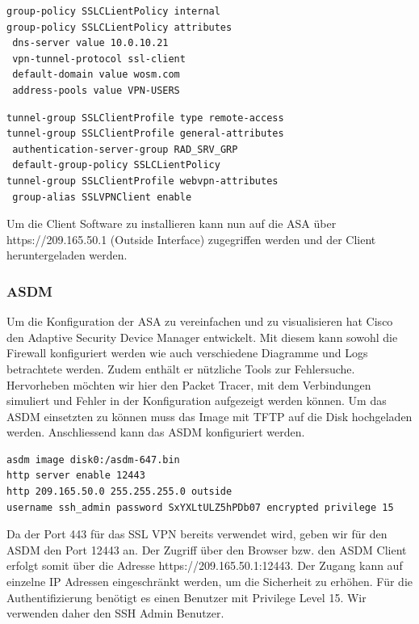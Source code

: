 \documentclass[11pt,a4paper,parskip=half]{scrartcl}
\begin{document}
\begin{lstlisting}
group-policy SSLCLientPolicy internal
group-policy SSLCLientPolicy attributes
 dns-server value 10.0.10.21
 vpn-tunnel-protocol ssl-client
 default-domain value wosm.com
 address-pools value VPN-USERS
\end{lstlisting}

\begin{lstlisting}
tunnel-group SSLClientProfile type remote-access
tunnel-group SSLClientProfile general-attributes
 authentication-server-group RAD_SRV_GRP
 default-group-policy SSLCLientPolicy
tunnel-group SSLClientProfile webvpn-attributes
 group-alias SSLVPNClient enable
\end{lstlisting}

Um die Client Software zu installieren kann nun auf die ASA über https://209.165.50.1 (Outside Interface) zugegriffen werden und der Client heruntergeladen werden.

\subsubsection{ASDM}
Um die Konfiguration der ASA zu vereinfachen und zu visualisieren hat Cisco den Adaptive Security Device Manager entwickelt. Mit diesem kann sowohl die Firewall konfiguriert 
werden wie auch verschiedene Diagramme und Logs betrachtete werden. Zudem enthält er nützliche Tools zur Fehlersuche. Hervorheben möchten wir hier den Packet Tracer, mit dem Verbindungen simuliert und Fehler in der Konfiguration aufgezeigt werden können. Um das ASDM einsetzten zu können muss das Image mit TFTP auf die Disk hochgeladen werden. Anschliessend kann das ASDM konfiguriert werden.
\begin{lstlisting}
asdm image disk0:/asdm-647.bin
http server enable 12443
http 209.165.50.0 255.255.255.0 outside
username ssh_admin password SxYXLtULZ5hPDb07 encrypted privilege 15
\end{lstlisting}
Da der Port 443 für das SSL VPN bereits verwendet wird, geben wir für den ASDM den Port 12443 an. Der Zugriff über den Browser bzw. den ASDM Client erfolgt somit über die Adresse https://209.165.50.1:12443. Der Zugang kann auf einzelne IP Adressen eingeschränkt werden, um die Sicherheit zu erhöhen. Für die Authentifizierung benötigt es einen Benutzer mit Privilege Level 15. Wir verwenden daher den SSH Admin Benutzer.
 
\end{document}
